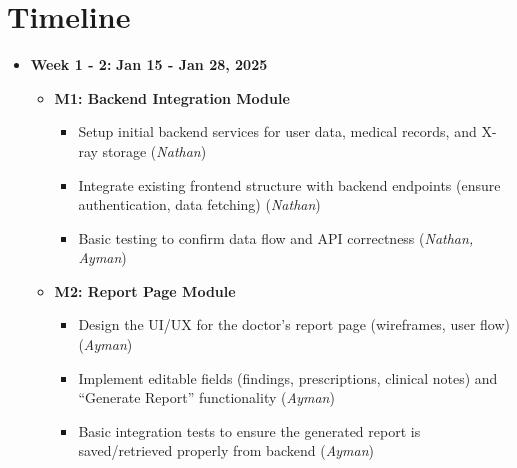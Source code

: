 \documentclass[12pt, titlepage]{article}
\newcommand{\rt}[1]{\textbf{#1}}
\begin{document}
\section{Timeline}
\begin{itemize} \item \textbf{Week 1 - 2:} \rt{Jan 15 - Jan 28, 2025} \begin{itemize} \item \textbf{M1: Backend Integration Module} \begin{itemize} \item Setup initial backend services for user data, medical records, and X-ray storage (\textit{Nathan}) \item Integrate existing frontend structure with backend endpoints (ensure authentication, data fetching) (\textit{Nathan}) \item Basic testing to confirm data flow and API correctness (\textit{Nathan, Ayman}) \end{itemize} \item \textbf{M2: Report Page Module} \begin{itemize} \item Design the UI/UX for the doctor’s report page (wireframes, user flow) (\textit{Ayman}) \item Implement editable fields (findings, prescriptions, clinical notes) and “Generate Report” functionality (\textit{Ayman}) \item Basic integration tests to ensure the generated report is saved/retrieved properly from backend (\textit{Ayman}) \end{itemize} \end{itemize}


\end{itemize}
\end{document}
